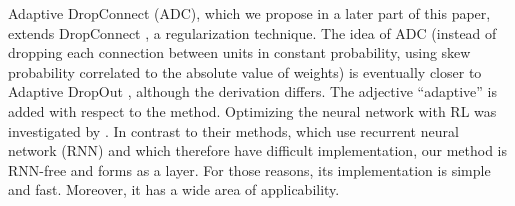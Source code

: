 Adaptive DropConnect (ADC), which we propose in a later part of this paper, extends DropConnect \citep{wan2013regularization}, a regularization technique.
The idea of ADC (instead of dropping each connection between units in constant probability, using skew probability correlated to the absolute value of weights) is eventually closer to Adaptive DropOut \citep{ba2013adaptive}, although the derivation differs.
The adjective ``adaptive'' is added with respect to the method.
Optimizing the neural network with RL was investigated by \cite{andrychowicz2016learning}.
In contrast to their methods, which use recurrent neural network (RNN) and which therefore have difficult implementation,
our method is RNN-free and forms as a layer. For those reasons, its implementation is simple and fast. Moreover, it has a wide area of applicability.
